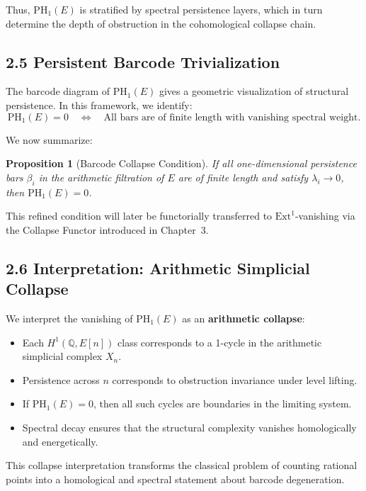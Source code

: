 \documentclass[11pt]{article}
\newtheorem{proposition}[theorem]{Proposition}
\begin{document}
Thus, $\mathrm{PH}_1(E)$ is stratified by spectral persistence layers, which in turn determine the depth of obstruction in the cohomological collapse chain.

\subsection{2.5 Persistent Barcode Trivialization}

The barcode diagram of $\mathrm{PH}_1(E)$ gives a geometric visualization of structural persistence.  
In this framework, we identify:
\[
\mathrm{PH}_1(E) = 0 \quad \Longleftrightarrow \quad \text{All bars are of finite length with vanishing spectral weight.}
\]

We now summarize:

\begin{proposition}[Barcode Collapse Condition]
If all one-dimensional persistence bars $\beta_i$ in the arithmetic filtration of $E$ are of finite length and satisfy $\lambda_i \to 0$, then $\mathrm{PH}_1(E) = 0$.
\end{proposition}

This refined condition will later be functorially transferred to $\mathrm{Ext}^1$-vanishing via the Collapse Functor introduced in Chapter~3.

\subsection{2.6 Interpretation: Arithmetic Simplicial Collapse}

We interpret the vanishing of $\mathrm{PH}_1(E)$ as an \textbf{arithmetic collapse}:

\begin{itemize}
  \item Each $H^1(\mathbb{Q},E[n])$ class corresponds to a 1-cycle in the arithmetic simplicial complex $X_n$.
  \item Persistence across $n$ corresponds to obstruction invariance under level lifting.
  \item If $\mathrm{PH}_1(E)=0$, then all such cycles are boundaries in the limiting system.
  \item Spectral decay ensures that the structural complexity vanishes homologically and energetically.
\end{itemize}

This collapse interpretation transforms the classical problem of counting rational points into a homological and spectral statement about barcode degeneration.
\end{document}
